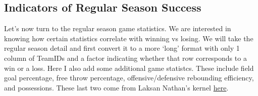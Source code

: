 \documentclass[]{article}
\begin{document}
\subsection{Indicators of Regular Season Success}\label{regseason}

Let's now turn to the regular season game statistics. We are interested
in knowing how certain statistics correlate with winning vs losing. We
will take the regular season detail and first convert it to a more
`long' format with only 1 column of TeamIDs and a factor indicating
whether that row corresponds to a win or a loss. Here I also add some
additional game statistcs. These include field goal percentage, free
throw percentage, offensive/defensive rebounding efficiency, and
possessions. These last two come from Laksan Nathan's kernel
\href{https://www.kaggle.com/lnatml/feature-engineering-with-advanced-stats}{here}.
\end{document}
